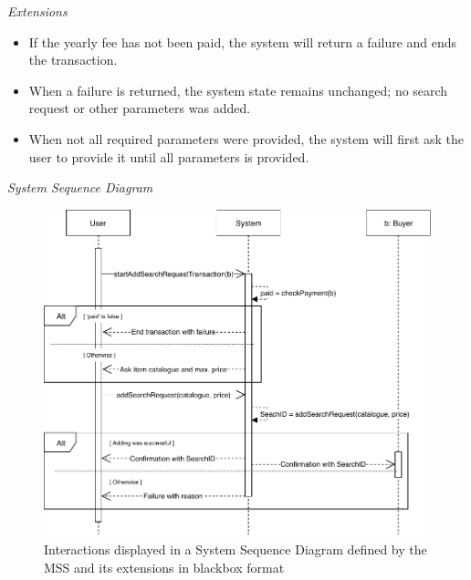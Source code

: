\textsl{Extensions}
\begin{itemize}[noitemsep]
	\item If the yearly fee has not been paid, the system will return a failure and ends the transaction.
	\item When a failure is returned, the system state remains unchanged; no search request or other parameters was added.
	\item When not all required parameters were provided, the system will first ask the user to provide it until all parameters is provided.
\end{itemize}
\textsl{System Sequence Diagram}
\begin{figure}[H]
	\centering
	\includegraphics[scale=1]{uml/SD-bb-createsearch.pdf}
	\caption*{Interactions displayed in a System Sequence Diagram defined by the MSS and its extensions in blackbox format}
\end{figure}